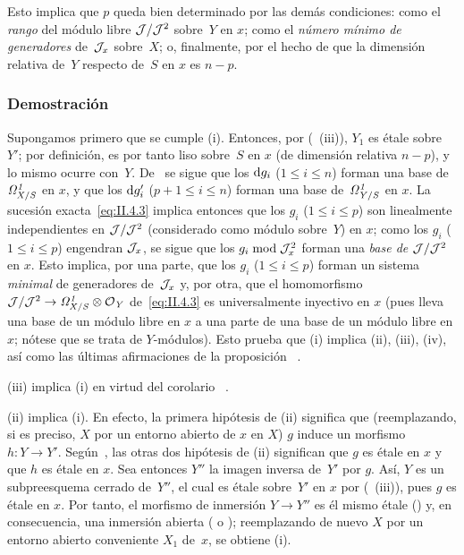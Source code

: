 \begin{remarquestar}
Esto implica que $p$ queda bien determinado por las demás condiciones: como el \emph{rango} del módulo libre $\cal{J}/\cal{J}^2$ sobre~$Y$ en $x$; como el \emph{número mínimo de generadores} de~$\cal{J}_x$ sobre~$X$; o, finalmente, por el hecho de que la dimensión relativa de~$Y$ respecto de~$S$ en $x$ es $n-p$.
\end{remarquestar}

\subsubsection*{Demostración}
Supongamos primero que se cumple (i). Entonces, por (~(iii)), $Y_1$ es étale sobre~$Y'$; por definición, es por tanto liso sobre~$S$ en $x$ (de dimensión relativa $n-p$), y lo mismo ocurre con~$Y$. De~ se sigue que los $\rd g_i$ ($1\leq i\leq n$) forman una base de~$\it{\Omega}^1_{X/S}$ en $x$, y que los $\rd g'_i$ ($p+1\leq i\leq n$) forman una base de~$\it{\Omega}^1_{Y/S}$ en $x$. La sucesión exacta~\eqref{eq:II.4.3} implica entonces que los $g_i$ ($1\leq i\leq p$) son linealmente independientes en $\cal{J}/\cal{J}^2$ (considerado como módulo sobre~$Y$) en $x$; como los $g_i$ ($1\leq i\leq p$) engendran $\cal{J}_x$, se sigue que los $g_i\bmod\cal{J}_x^2$ forman una \emph{base de} $\cal{J}/\cal{J}^2$ en $x$. Esto implica, por una parte, que los $g_i$ ($1\leq i\leq p$) forman un sistema \emph{minimal} de generadores de~$\cal{J}_x$ y, por otra, que el homomorfismo $\cal{J}/\cal{J}^2\to\it{\Omega}^1_{X/S}\otimes\cal{O}_Y$ de~\eqref{eq:II.4.3} es universalmente inyectivo en $x$ (pues lleva una base de un módulo libre en $x$ a una parte de una base de un módulo libre en $x$; nótese que se trata de $Y$-módulos). Esto prueba que (i) implica (ii), (iii), (iv), así como las últimas afirmaciones de la proposición~
.

(iii) implica (i) en virtud del corolario~
.

(ii)
implica (i). En efecto, la primera hipótesis de (ii) significa que (reemplazando, si es preciso, $X$ por un entorno abierto de $x$ en $X$) $g$ induce un morfismo $h\colon Y\to Y'$. Según~, las otras dos hipótesis de (ii) significan que $g$ es étale en $x$ y que $h$ es étale en $x$. Sea entonces $Y''$ la imagen inversa de~$Y'$ por $g$. Así, $Y$ es un subpreesquema cerrado de~$Y''$, el cual es étale sobre~$Y'$ en $x$ por (~(iii)), pues $g$ es étale en $x$. Por tanto, el morfismo de inmersión $Y\to Y''$ es él mismo étale () y, en consecuencia, una inmersión abierta ( o ); reemplazando de nuevo $X$ por un entorno abierto conveniente $X_1$ de~$x$, se obtiene (i).


